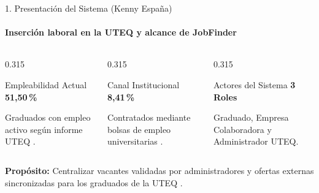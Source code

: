 \documentclass[aspectratio=169,10pt]{beamer}
\begin{document}
\begin{frame}{1. Presentación del Sistema (Kenny España)}
  \framesubtitle{Inserción laboral en la UTEQ y alcance de JobFinder \cite{uteq2022seguimiento}}
  \vspace{0.15cm}
  \begin{columns}[T,totalwidth=\textwidth]
    \begin{column}{0.315\textwidth}
      \begin{bluecard}{Empleabilidad Actual}
        \centering
        \vspace{0.15cm}
        {\Huge\bfseries\textcolor{BlueAccent}{51,50\,\%}}\par
        \vspace{0.2cm}
        \footnotesize Graduados con empleo activo según informe UTEQ \cite{uteq2022seguimiento}.
      \end{bluecard}
    \end{column}
    \begin{column}{0.315\textwidth}
      \begin{ambercard}{Canal Institucional}
        \centering
        \vspace{0.15cm}
        {\Huge\bfseries\textcolor{AmberAccent}{8,41\,\%}}\par
        \vspace{0.2cm}
        \footnotesize Contratados mediante bolsas de empleo universitarias \cite{uteq2022seguimiento}.
      \end{ambercard}
    \end{column}
    \begin{column}{0.315\textwidth}
      \begin{bluecard}{Actores del Sistema}
        \centering
        \vspace{0.15cm}
        {\Huge\bfseries\textcolor{NavyDark}{3 Roles}}\par
        \vspace{0.2cm}
        \footnotesize Graduado, Empresa Colaboradora y Administrador UTEQ.
      \end{bluecard}
    \end{column}
  \end{columns}
  \vspace{0.45cm}
  \begin{demobar}
    \textcolor{AmberAccent}{\textbf{Propósito:}} Centralizar vacantes validadas por administradores y ofertas externas sincronizadas para los graduados de la UTEQ \cite{ref1}.
  \end{demobar}
\end{frame}
\end{document}
